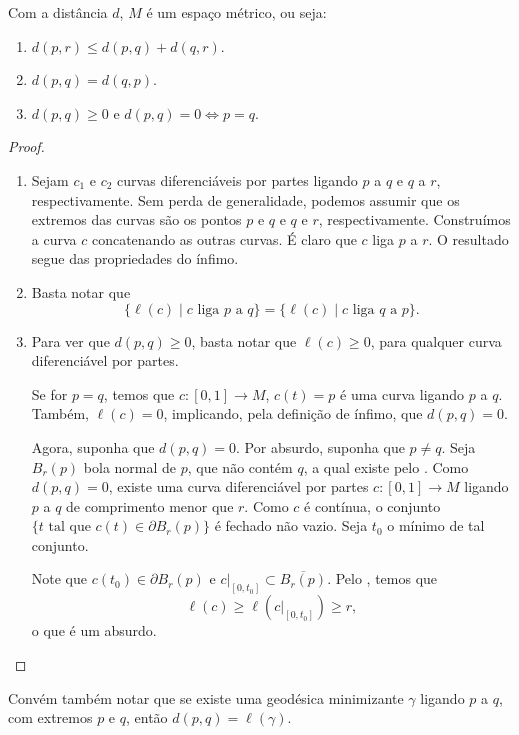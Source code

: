 \begin{proposition}
    \label{prop:distancia-metrica}
    Com a distância $d$, $M$ é um espaço métrico, ou seja:

    \begin{enumerate}[label=(\roman*)]
        \item $d(p,r) \leq d(p,q) + d(q,r)$.
        \item $d(p,q) = d(q,p)$.
        \item $d(p,q) \geq 0$ e $d(p,q) = 0 \iff p = q$.
    \end{enumerate}
    \begin{proof}
        $ $
        \begin{enumerate}[label=(\roman*)]
            \item Sejam $c_1$ e $c_2$ curvas diferenciáveis por partes ligando $p$ a $q$ e $q$ a $r$, respectivamente. Sem perda de generalidade, podemos assumir que os extremos das curvas são os pontos $p$ e $q$ e $q$ e $r$, respectivamente. Construímos a curva $c$ concatenando as outras curvas. É claro que $c$ liga $p$ a $r$. O resultado segue das propriedades do ínfimo.
            \item Basta notar que
                  \begin{equation*}
                      \{\ell(c) \mid c \text{ liga } p \text{ a } q\} = \{\ell(c) \mid c \text{ liga } q \text{ a } p\}.
                  \end{equation*}
            \item Para ver que $d(p,q) \geq 0$, basta notar que $\ell(c) \geq 0$, para qualquer curva diferenciável por partes.

                  Se for $p = q$, temos que $c: [0,1] \to M$, $c(t) = p$ é uma curva ligando $p$ a $q$. Também, $\ell(c) = 0$, implicando, pela definição de ínfimo, que $d(p,q) = 0$.

                  Agora, suponha que $d(p,q) = 0$. Por absurdo, suponha que $p \neq q$. Seja $B_r(p)$ bola normal de $p$, que não contém $q$, a qual existe pelo . Como $d(p,q) = 0$, existe uma curva diferenciável por partes $c: [0,1] \to M$ ligando $p$ a $q$ de comprimento menor que $r$. Como $c$ é contínua, o conjunto $\{t \text{ tal que } c(t) \in \partial B_r(p)\}$ é fechado não vazio. Seja $t_0$ o mínimo de tal conjunto.

                  Note que $c(t_0) \in \partial B_r(p)$ e $c|_{[0,t_0]} \subset \overline{B_r(p)}$. Pelo , temos que
                  \begin{equation*}
                      \ell(c) \geq \ell(c|_{[0,t_0]}) \geq r,
                  \end{equation*}
                  o que é um absurdo.
        \end{enumerate}
    \end{proof}
\end{proposition}
Convém também notar que se existe uma geodésica minimizante $\gamma$ ligando $p$ a $q$, com extremos $p$ e $q$, então $d(p,q) = \ell(\gamma)$.

